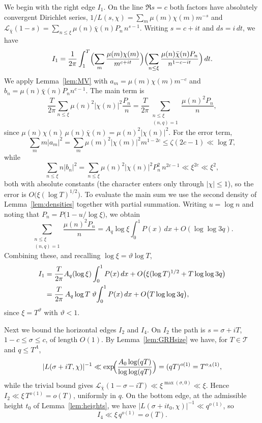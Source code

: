 \documentclass[10pt,a4paper]{amsart}
\numberwithin{equation}{section}
\begin{document}
We begin with the right edge $I_1$. On the line $\Re s=c$ both factors have absolutely convergent Dirichlet series, $1/L(s,\chi)=\sum_{m}\mu(m)\chi(m)m^{-s}$ and $\mathcal{L}_{\bar\chi}(1-s)=\sum_{n\le\xi}\mu(n)\bar\chi(n)P_n\,n^{s-1}$. Writing $s=c+it$ and $ds=i\,dt$, we have
\[
I_1=\frac{1}{2\pi}\int_1^T\Bigl(\sum_{m}\frac{\mu(m)\chi(m)}{m^{c+it}}\Bigr)\Bigl(\sum_{n\le\xi}\frac{\mu(n)\bar\chi(n)P_n}{n^{1-c-it}}\Bigr)\,dt.
\]
We apply Lemma~\ref{lem:MV} with $a_m=\mu(m)\chi(m)m^{-c}$ and $b_n=\mu(n)\bar\chi(n)P_n n^{c-1}$. The main term is
\[
\frac{T}{2\pi}\sum_{n\le\xi}\mu(n)^2|\chi(n)|^2\frac{P_n}{n}=\frac{T}{2\pi}\sum_{\substack{n\le\xi\\(n,q)=1}}\frac{\mu(n)^2P_n}{n},
\]
since $\mu(n)\chi(n)\,\mu(n)\bar\chi(n)=\mu(n)^2|\chi(n)|^2$. For the error term,
\[
\sum_m m|a_m|^2=\sum_m\mu(m)^2|\chi(m)|^2m^{1-2c}\le\zeta(2c-1)\ll\log T,
\]
while
\[
\sum_{n\le\xi}n|b_n|^2=\sum_{n\le\xi}\mu(n)^2|\chi(n)|^2P_n^2\,n^{2c-1}\ll\xi^{2c}\ll\xi^2 ,
\]
both with absolute constants (the character enters only through $|\chi|\le1$), so the error is $O\bigl(\xi(\log T)^{1/2}\bigr)$. To evaluate the main sum we use the second density of Lemma~\ref{lem:densities} together with partial summation. Writing $u=\log n$ and noting that $P_n=P\bigl(1-u/\log\xi\bigr)$, we obtain
\[
\sum_{\substack{n\le\xi\\(n,q)=1}}\frac{\mu(n)^2P_n}{n}=A_q\log\xi\int_0^1 P(x)\,dx+O(\log\log 3q).
\]
Combining these, and recalling $\log\xi=\vartheta\log T$,
\begin{align}
I_1&=\frac{T}{2\pi}A_q(\log\xi)\int_0^1 P(x)\,dx+O\bigl(\xi(\log T)^{1/2}+T\log\log 3q\bigr)\notag\\
&=\frac{T}{2\pi}\,A_q\log T\;\vartheta\!\int_0^1 P(x)\,dx+O\bigl(T\log\log 3q\bigr),\label{eq:I1-MN}
\end{align}
since $\xi=T^{\vartheta}$ with $\vartheta<1$.

Next we bound the horizontal edges $I_2$ and $I_4$. On $I_2$ the path is $s=\sigma+iT$, $1-c\le\sigma\le c$, of length $O(1)$. By Lemma~\ref{lem:GRHsize} we have, for $T\in\mathcal T$ and $q\le T^{A}$,
\[
|L(\sigma+iT,\chi)|^{-1}\ll\exp\!\Bigl(\frac{A_0\log(qT)}{\log\log(qT)}\Bigr)=(qT)^{o(1)}=T^{o_A(1)},
\]
while the trivial bound gives $\mathcal{L}_{\bar\chi}(1-\sigma-iT)\ll\xi^{\max(\sigma,0)}\ll\xi$. Hence $I_2\ll\xi\,T^{o(1)}=o(T)$, uniformly in $q$. On the bottom edge, at the admissible height $t_0$ of Lemma~\ref{lem:heights}, we have $|L(\sigma+it_0,\chi)|^{-1}\ll q^{o(1)}$, so
\[
I_4\ll\xi\,q^{o(1)}=o(T).
\]
\end{document}
